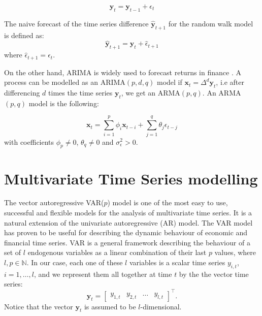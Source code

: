 \begin{equation}
\mathbf{y}_t = \mathbf{y}_{t-1} + \epsilon_{t}
\label{rwmodel}
\end{equation}

The naive forecast of the time series difference $\hat{\mathbf{y}}_{t+1}$ for
the random walk model is defined as:
\begin{equation}
\hat{\mathbf{y}}_{t+1} = \mathbf{y}_t + \hat{\epsilon}_{t+1} 
\end{equation}
\noindent where  $\hat{\epsilon}_{t+1} = \epsilon_{t}$.

On the other hand, ARIMA is widely used to forecast returns in finance
\cite{tsay2005}. A process can be modelled as an ARIMA$(p,d,q)$ model if
$\mathbf{x}_t=\Delta^d \mathbf{y}_t $, i.e after differencing $d$ times the time
series $\mathbf{y}_t$,  we get an ARMA$(p,q)$. An ARMA$(p,q)$ model is the
following:

\begin{equation}
\mathbf{x}_t = \sum_{i=1}^p \phi_i \mathbf{x}_{t-i}  +  \sum_{j=1}^q \theta_j \epsilon_{t-j}  
\end{equation}
\noindent with coefficients $\phi_p \neq 0$, $\theta_q \neq 0$ and $\sigma_{\epsilon}^2 > 0$.

\section{Multivariate Time Series modelling}

The vector autoregressive VAR($p$) model \cite{sims1980} is one of the most easy
to use, successful and flexible models for the analysis of multivariate time
series. It is a natural extension of the univariate autoregressive (AR) model.
The VAR model has proven to be useful for describing the dynamic behaviour of
economic and financial time series.  VAR is a general framework describing the
behaviour of a set of $l$ endogenous variables as a linear combination of their
last $p$ values, where $l,p\in\mathbb{N}$.  In our case, each one of these $l$
variables is a scalar time series $y_{i,t}$, $i=1,\dots,l$, and we represent
them all together at time $t$ by the the vector time series:
\begin{equation*}
\label{eq:variables}
\mathbf{y}_t = 
\begin{bmatrix} y_{1,t} & y_{2,t} & \dots & y_{l,t} \end{bmatrix}^\top.
\end{equation*}
\noindent
Notice that the vector $\mathbf{y}_t$ is assumed to be $l$-dimensional.

